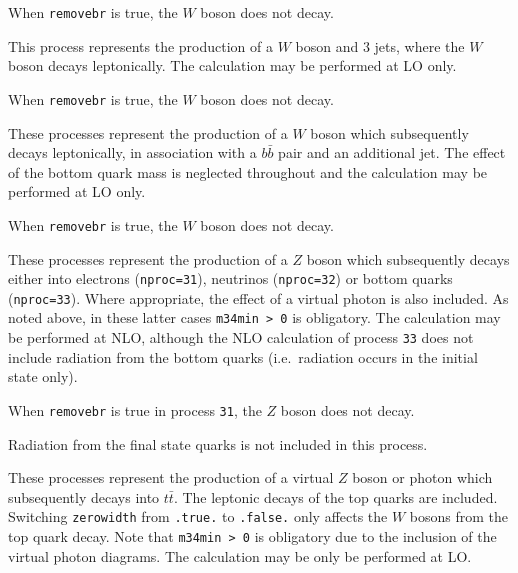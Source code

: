 When {\tt removebr} is true, the $W$ boson does not decay.

\label{subsec:w3jets}

This process represents the production of a $W$ boson and $3$ jets,
where the $W$ boson decays leptonically. The calculation may be
performed at LO only.

When {\tt removebr} is true, the $W$ boson does not decay.

\label{subsec:wbbjetmassless}

These processes represent the production of a $W$ boson which subsequently
decays leptonically, in association with a $b{\bar b}$ pair and an
additional jet. The effect of the bottom quark mass is neglected throughout
and the calculation may be performed at LO only.

When {\tt removebr} is true, the $W$ boson does not decay.

\label{subsec:zboson}

These processes represent the production of a $Z$ boson which subsequently
decays either into electrons ({\tt nproc=31}), neutrinos ({\tt nproc=32})
or bottom quarks ({\tt nproc=33}). Where appropriate, the effect of a virtual
photon is also included. As noted above, in these latter cases {\tt m34min > 0}
is obligatory. The calculation may be performed at NLO,
although the NLO calculation of process {\tt 33} does not include radiation
from the bottom quarks (i.e.\ radiation occurs in the initial state only).

When {\tt removebr} is true in process {\tt 31}, the $Z$ boson does not decay.

Radiation from the final state quarks is not included in this process.


These processes represent the production of a virtual $Z$ boson or photon 
which subsequently decays into $t \bar{t}$.
The leptonic decays of the top quarks are included.
Switching {\tt zerowidth} from {\tt .true.} to {\tt .false.} only affects
the $W$ bosons from the top quark decay.
Note that {\tt m34min > 0} is obligatory due to the inclusion of the
virtual photon diagrams. The calculation may be only be performed at LO.


